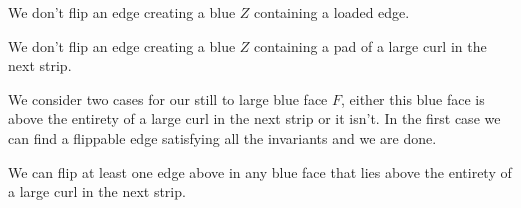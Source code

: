 \begin{invariants}
  \label{inv:uni:rest}
  \item We don't flip an edge creating a blue $Z$ containing a loaded edge.
  \item We don't flip an edge creating a blue $Z$ containing a pad of a large curl in the next strip.
\end{invariants}


We consider two cases for our still to large blue face $F$, either this blue face is above the entirety of a large curl in the next strip or it isn't.
In the first case we can find a flippable edge satisfying all the invariants and we are done.

\begin{lemma}
  \label{lm:uni:flipAboveLargeCurl}
  We can flip at least one edge above in any blue face that lies above the entirety of a large curl in the next strip.
\end{lemma}
